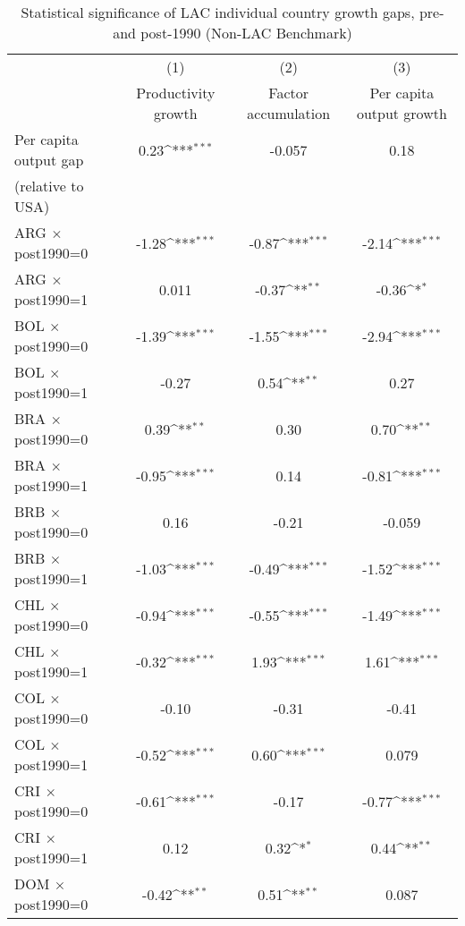 \begin{table}[htbp]\centering \footnotesize
\def\sym#1{\ifmmode^{#1}\else\(^{#1}\)\fi}
\caption{\footnotesize Statistical significance of LAC individual country growth gaps, pre- and post-1990 (Non-LAC Benchmark)}
\begin{tabular}{l*{3}{c}}
\toprule
                &\multicolumn{1}{c}{(1)}&\multicolumn{1}{c}{(2)}&\multicolumn{1}{c}{(3)}\\
                &\multicolumn{1}{c}{Productivity growth}&\multicolumn{1}{c}{Factor accumulation}&\multicolumn{1}{c}{Per capita output growth}\\
\midrule
Per capita output gap &     0.23\sym{***}&   -0.057         &     0.18         \\
(relative to USA) & & & \\
ARG $\times$ post1990=0&    -1.28\sym{***}&    -0.87\sym{***}&    -2.14\sym{***}\\
ARG $\times$ post1990=1&    0.011         &    -0.37\sym{**} &    -0.36\sym{*}  \\
BOL $\times$ post1990=0&    -1.39\sym{***}&    -1.55\sym{***}&    -2.94\sym{***}\\
BOL $\times$ post1990=1&    -0.27         &     0.54\sym{**} &     0.27         \\
BRA $\times$ post1990=0&     0.39\sym{**} &     0.30         &     0.70\sym{**} \\
BRA $\times$ post1990=1&    -0.95\sym{***}&     0.14         &    -0.81\sym{***}\\
BRB $\times$ post1990=0&     0.16         &    -0.21         &   -0.059         \\
BRB $\times$ post1990=1&    -1.03\sym{***}&    -0.49\sym{***}&    -1.52\sym{***}\\
CHL $\times$ post1990=0&    -0.94\sym{***}&    -0.55\sym{***}&    -1.49\sym{***}\\
CHL $\times$ post1990=1&    -0.32\sym{***}&     1.93\sym{***}&     1.61\sym{***}\\
COL $\times$ post1990=0&    -0.10         &    -0.31         &    -0.41         \\
COL $\times$ post1990=1&    -0.52\sym{***}&     0.60\sym{***}&    0.079         \\
CRI $\times$ post1990=0&    -0.61\sym{***}&    -0.17         &    -0.77\sym{***}\\
CRI $\times$ post1990=1&     0.12         &     0.32\sym{*}  &     0.44\sym{**} \\
DOM $\times$ post1990=0&    -0.42\sym{**} &     0.51\sym{**} &    0.087         \\

\end{tabular}
\end{table}
